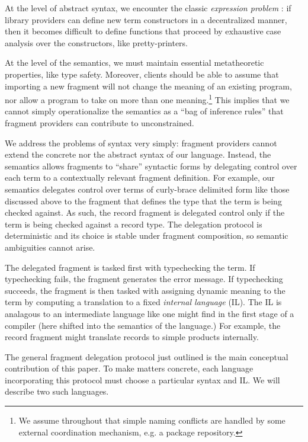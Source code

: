 \documentclass[preprint,10pt]{sigplanconf}
\begin{document}
At the level of abstract syntax, we encounter the classic \emph{expression problem} \cite{wadler1998expression,Reynolds75}: if library providers can define new term constructors in a decentralized manner, then it becomes difficult to define functions that proceed by exhaustive case analysis over the  constructors, like pretty-printers.

At the level of the semantics, we must maintain essential metatheoretic properties, like type safety. Moreover, clients should be able to  assume that importing a new fragment will not change the meaning of an existing program, nor allow a program to take on more than one meaning.\footnote{We assume throughout that simple naming conflicts are handled by some external coordination mechanism, e.g. a package repository.} This implies that we cannot simply operationalize the semantics as a ``bag of inference rules'' that fragment providers can contribute to unconstrained.

We address the problems of syntax very simply: fragment providers cannot extend the concrete nor the abstract syntax of our language.  Instead, the semantics allows fragments to ``share'' syntactic forms by delegating control over each term to a contextually relevant fragment definition. For example, our semantics delegates control over terms of curly-brace delimited form like those discussed above to the fragment that defines the type that the term is being checked against. As such, the record fragment is delegated control only if the term is being checked against a record type. The delegation protocol is deterministic and its choice is stable under fragment composition, so semantic ambiguities cannot arise.

The delegated fragment is tasked first with typechecking the term. If typechecking fails, the fragment generates the error message. If typechecking succeeds, the fragment is then tasked with assigning dynamic meaning to the term by computing a translation to a fixed \emph{internal language} (IL). The IL is analagous to an intermediate language like one might find in the first stage of a compiler (here shifted into the semantics of the language.) For example, the record fragment might translate records to simple products internally.

The general fragment delegation protocol just outlined is the main conceptual contribution of this paper. To make matters concrete, each language incorporating this protocol must choose a particular syntax and IL. We will describe two such languages. 
\end{document}
